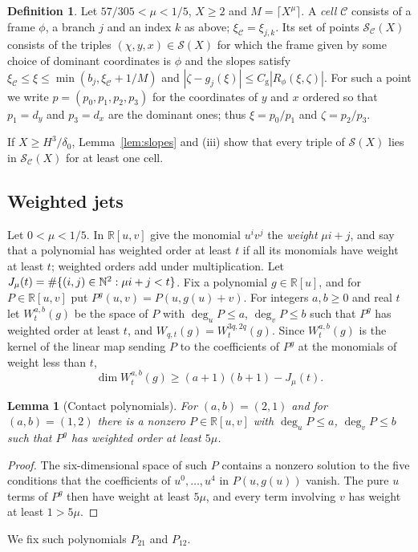 \documentclass[11pt,reqno]{amsart}
\newtheorem{lemma}[theorem]{Lemma}
\theoremstyle{definition}
\newtheorem{definition}[theorem]{Definition}
\theoremstyle{remark}
\numberwithin{equation}{section}
\newcommand{\R}{\mathbb R}\newcommand{\Z}{\mathbb Z}\newcommand{\N}{\mathbb N}
\begin{document}
\begin{definition}\label{def:cell}
Let $57/305<\mu<1/5$, $X\ge2$ and $M=\lceil X^\mu\rceil$. A \emph{cell}
$\mathcal C$ consists of a frame $\phi$, a branch $j$ and an index $k$ as
above; $\xi_{\mathcal C}=\xi_{j,k}$. Its set of points
$\mathcal S_{\mathcal C}(X)$ consists of the triples
$(\chi,y,x)\in\mathcal S(X)$ for which the frame given by some choice of
dominant coordinates is $\phi$ and the slopes satisfy
$\xi_{\mathcal C}\le\xi\le\min(b_j,\xi_{\mathcal C}+1/M)$ and
$|\zeta-g_j(\xi)|\le C_{\mathrm g}|R_\phi(\xi,\zeta)|$. For such a point we
write $p=(p_0,p_1,p_2,p_3)$ for the coordinates of $y$ and $x$ ordered so
that $p_1=d_y$ and $p_3=d_x$ are the dominant ones; thus $\xi=p_0/p_1$ and
$\zeta=p_2/p_3$.
\end{definition}
If $X\ge H^3/\delta_0$, Lemma~\ref{lem:slopes} and (iii) show that every
triple of $\mathcal S(X)$ lies in $\mathcal S_{\mathcal C}(X)$ for at least
one cell.

\subsection{Weighted jets}
Let $0<\mu<1/5$. In $\R[u,v]$ give the monomial $u^iv^j$ the \emph{weight}
$\mu i+j$, and say that a polynomial has weighted order at least $t$ if all
its monomials have weight at least $t$; weighted orders add under
multiplication. Let $J_\mu(t)=\card\{(i,j)\in\N^2:\mu i+j<t\}$. Fix a
polynomial $g\in\R[u]$, and for $P\in\R[u,v]$ put $P^g(u,v)=P(u,g(u)+v)$.
For integers $a,b\ge0$ and real $t$ let $W^{a,b}_t(g)$ be the space of
$P$ with $\deg_uP\le a$, $\deg_vP\le b$ such that $P^g$ has weighted order
at least $t$, and $W_{q,t}(g)=W^{3q,2q}_t(g)$. Since $W^{a,b}_t(g)$ is the
kernel of the linear map sending $P$ to the coefficients of $P^g$ at the
monomials of weight less than $t$,
\begin{equation}\label{eq:codim}
 \dim W^{a,b}_t(g)\ge(a+1)(b+1)-J_\mu(t).
\end{equation}

\begin{lemma}[Contact polynomials]\label{lem:contact}
For $(a,b)=(2,1)$ and for $(a,b)=(1,2)$ there is a nonzero $P\in\R[u,v]$
with $\deg_uP\le a$, $\deg_vP\le b$ such that $P^g$ has weighted order at
least $5\mu$.
\end{lemma}
\begin{proof}
The six-dimensional space of such $P$ contains a nonzero solution to
the five conditions that the coefficients of $u^0,\ldots,u^4$ in
$P(u,g(u))$ vanish. The pure $u$ terms of $P^g$ then have weight at
least $5\mu$, and every term involving $v$ has weight at least $1>5\mu$.
\end{proof}
We fix such polynomials $P_{21}$ and $P_{12}$.
\end{document}
